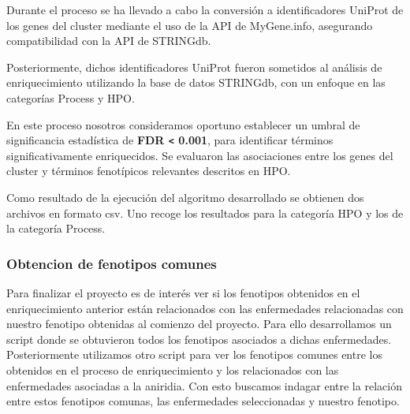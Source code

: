 Durante el proceso se ha llevado a cabo la conversión a identificadores UniProt de los genes del cluster mediante el uso de la API de MyGene.info, asegurando compatibilidad con la API de STRINGdb.

Posteriormente, dichos identificadores UniProt fueron sometidos al análisis de enriquecimiento utilizando la base de datos STRINGdb, con un enfoque en las categorías Process y HPO. 

En este proceso nosotros consideramos oportuno establecer un umbral de significancia estadística de \textbf{ FDR  \texttt< 0.001}, para identificar términos significativamente enriquecidos.
Se evaluaron las asociaciones entre los genes del cluster y términos fenotípicos relevantes descritos en HPO.

Como resultado de la ejecución del algoritmo desarrollado se obtienen dos archivos en formato csv. Uno recoge los resultados para la categoría HPO y los de la categoría Process.



\subsubsection{Obtencion de fenotipos comunes}

Para finalizar el proyecto es de interés ver si los fenotipos obtenidos en el enriquecimiento anterior están relacionados con las enfermedades relacionadas con nuestro fenotipo obtenidas al comienzo del proyecto. Para ello desarrollamos un script donde se obtuvieron todos los fenotipos asociados a dichas enfermedades. Posteriormente utilizamos otro script para ver los fenotipos comunes entre los obtenidos en el proceso de enriquecimiento y los relacionados con las enfermedades asociadas a la aniridia. Con esto buscamos indagar entre la relación entre estos fenotipos comunas, las enfermedades seleccionadas y nuestro fenotipo.
